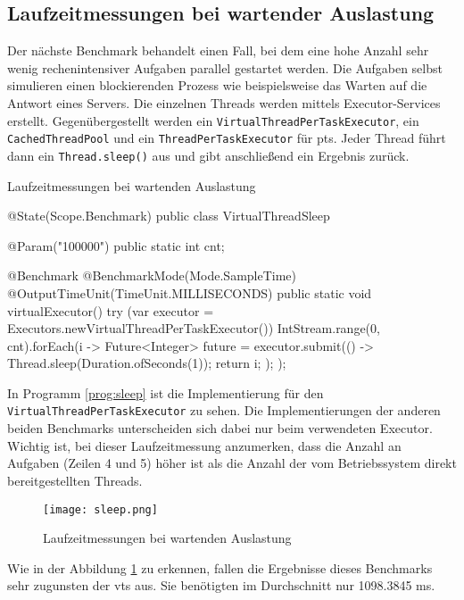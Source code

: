 \subsection{Laufzeitmessungen bei wartender Auslastung}                                         
\label{subsec:sleep}

    Der nächste Benchmark behandelt einen Fall, bei dem eine hohe Anzahl sehr wenig rechenintensiver Aufgaben parallel gestartet werden. Die Aufgaben selbst simulieren einen blockierenden
    Prozess wie beispielsweise das
    Warten auf die Antwort eines Servers. Die einzelnen Threads werden mittels Executor-Services erstellt. Gegenübergestellt werden ein \texttt{VirtualThreadPerTaskExecutor}, ein \texttt{CachedThreadPool}
    und ein \texttt{ThreadPerTaskExecutor} für \Glspl{pt}. Jeder Thread führt dann ein \texttt{Thread.sleep()} aus und gibt anschließend ein Ergebnis zurück. 
    \begin{program} [H]
        \caption{Laufzeitmessungen bei wartenden Auslastung}
        \label{prog:sleep}
    \begin{JavaCode}[language=Java, numbers=left]
@State(Scope.Benchmark)
public class VirtualThreadSleep {

    @Param("100000")
    public static int cnt;

    @Benchmark
    @BenchmarkMode(Mode.SampleTime)
    @OutputTimeUnit(TimeUnit.MILLISECONDS)
    public static void virtualExecutor() { 
        try (var executor = Executors.newVirtualThreadPerTaskExecutor()) {
            IntStream.range(0, cnt).forEach(i -> {
                Future<Integer> future = executor.submit(() -> {
                    Thread.sleep(Duration.ofSeconds(1)); return i;
                });
            });
        }
    }
}\end{JavaCode}
    \end{program}
    In Programm \ref{prog:sleep} ist die Implementierung für den \texttt{VirtualThreadPerTaskExecutor} zu sehen. Die Implementierungen der anderen beiden Benchmarks unterscheiden sich dabei nur beim verwendeten 
    Executor. Wichtig ist, bei dieser Laufzeitmessung anzumerken, dass die Anzahl an Aufgaben (Zeilen 4 und  5) höher ist als die Anzahl der vom Betriebssystem direkt bereitgestellten Threads.
    \begin{figure}[H]
        \centering
        \texttt{[image: sleep.png]}
        \caption{Laufzeitmessungen bei wartenden Auslastung}
        \label{fig:sleep}
    \end{figure}
    Wie in der Abbildung \ref{fig:sleep} zu erkennen, fallen die Ergebnisse dieses Benchmarks sehr zugunsten der \Glspl{vt} aus. Sie benötigten im Durchschnitt  nur 1098.3845 ms. 
